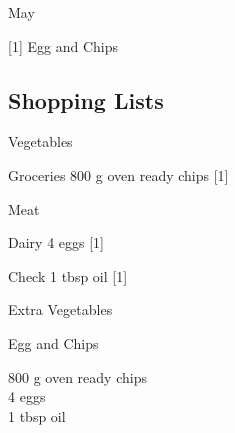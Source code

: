 		\begin{menu}{May}
    
    \begin{recipelist}
    
        {\scriptsize[1]} Egg and Chips\\
    \end{recipelist}%
    \begin{recipelist}
    
    \end{recipelist}\par%
  
    \subsection*{Shopping Lists}
      \begin{shoppinglist}{Vegetables}
      \end{shoppinglist}%
      \begin{shoppinglist}{Groceries}
      800 g oven ready chips 
        {\scriptsize[1]}\\
      \end{shoppinglist}%
      \par\vfil %
      \begin{shoppinglist}{Meat}
      \end{shoppinglist}%
      \begin{shoppinglist}{Dairy}
      4  eggs 
        {\scriptsize[1]}\\
      \end{shoppinglist}%
      \par\vfil %
      \vfil\clearpage %
      \begin{shoppinglist}{Check}
      1 tbsp oil 
        {\scriptsize[1]}\\
      \end{shoppinglist}%
      \begin{shoppinglist}{Extra Vegetables}
      \end{shoppinglist}%
      \par\vfil %
    \vfil\clearpage
  
    \begin{recipe}{1}{Egg and Chips}%
		\begin{ingredients}
		800 g oven ready chips  \\
	4  eggs  \\
	1 tbsp oil  \\
	

\end{ingredients}
\end{recipe}
\end{menu}
